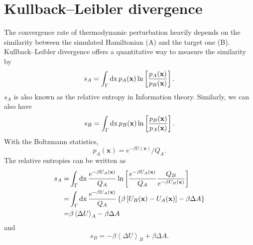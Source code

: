 \section{Kullback–Leibler divergence\label{Sec:Eva:KLDverg}}
The convergence rate of thermodynamic perturbation heavily depends on the similarity between the simulated Hamiltonian (A) and the target one (B). Kullback–Leibler divergence offers a quantitative way to measure the similarity by
\begin{equation}
	s_A=\int_\Gamma \mathop{}\!\mathrm{d} \mathrm{x}\, p_A(\mathbf{x})\ln\left[\frac{p_A(\mathbf{x})}{p_B(\mathbf{x})}\right].
\end{equation}
$s_A$ is also known as the relative entropy in Information theory. Similarly, we can also have
\begin{equation}
	s_B=\int_\Gamma \mathop{}\!\mathrm{d} \mathrm{x}\, p_B(\mathbf{x})\ln\left[\frac{p_B(\mathbf{x})}{p_A(\mathbf{x})}\right].
\end{equation}
With the Boltzmann statistics,
\begin{equation}
	p_A(\mathbf{x})=e^{-\beta U(\mathbf{x})}/Q_A.
\end{equation}
The relative entropies can be written as
\begin{align}
	s_A=&\int_\Gamma \mathop{}\!\mathrm{d} \mathrm{x}\, \frac{e^{-\beta U_A(\mathbf{x})}}{Q_A}\ln\left[\frac{e^{-\beta U_A(\mathbf{x})}}{Q_A}\frac{Q_B}{e^{-\beta U_B(\mathbf{x})}}\right]\notag\\
	   =&\int_\Gamma \mathop{}\!\mathrm{d} \mathrm{x}\, \frac{e^{-\beta U_A(\mathbf{x})}}{Q_A} \left\{\beta \left[U_B(\mathbf{x})-U_A(\mathbf{x})\right]-\beta \Delta A\right\}\\
	   =&\beta\left<\Delta U\right>_A-\beta \Delta A
\end{align}
and
\begin{equation}
	s_B=-\beta\left<\Delta U\right>_B+\beta \Delta A.
\end{equation}

